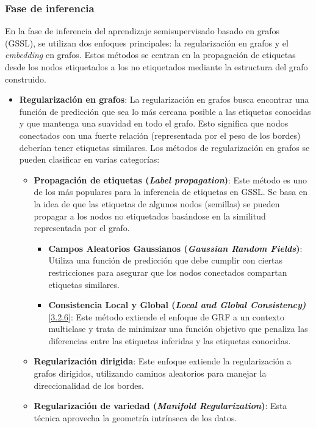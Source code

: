 \subsubsection{Fase de inferencia}
En la fase de inferencia del aprendizaje semisupervisado basado en grafos (GSSL), se utilizan dos enfoques principales: la regularización en grafos y el \textit{embedding} en grafos. Estos métodos se centran en la propagación de etiquetas desde los nodos etiquetados a los no etiquetados mediante la estructura del grafo construido.
\begin{itemize}
	\item \textbf{Regularización en grafos}: La regularización en grafos busca encontrar una función de predicción que sea lo más cercana posible a las etiquetas conocidas y que mantenga una suavidad en todo el grafo. Esto significa que nodos conectados con una fuerte relación (representada por el peso de los bordes) deberían tener etiquetas similares. Los métodos de regularización en grafos se pueden clasificar en varias categorías:
	\begin{itemize}
		\item \textbf{Propagación de etiquetas (\textit{Label propagation})}: Este método es uno de los más populares para la inferencia de etiquetas en GSSL. Se basa en la idea de que las etiquetas de algunos nodos (semillas) se pueden propagar a los nodos no etiquetados basándose en la similitud representada por el grafo.
		\begin{itemize}
			\item \textbf{Campos Aleatorios Gaussianos (\textit{Gaussian Random Fields})}: Utiliza una función de predicción que debe cumplir con ciertas restricciones para asegurar que los nodos conectados compartan etiquetas similares.
			\item \textbf{Consistencia Local y Global (\textit{Local and Global Consistency)}} [\hyperref[sec3:LGC]{3.2.6}]: Este método extiende el enfoque de GRF a un contexto multiclase y trata de minimizar una función objetivo que penaliza las diferencias entre las etiquetas inferidas y las etiquetas conocidas.
		\end{itemize}
		\item \textbf{Regularización dirigida}: Este enfoque extiende la regularización a grafos dirigidos, utilizando caminos aleatorios para manejar la direccionalidad de los bordes.
		\item \textbf{Regularización de variedad (\textit{Manifold Regularization})}:  Esta técnica aprovecha la geometría intrínseca de los datos.

\end{itemize}
\end{itemize}
